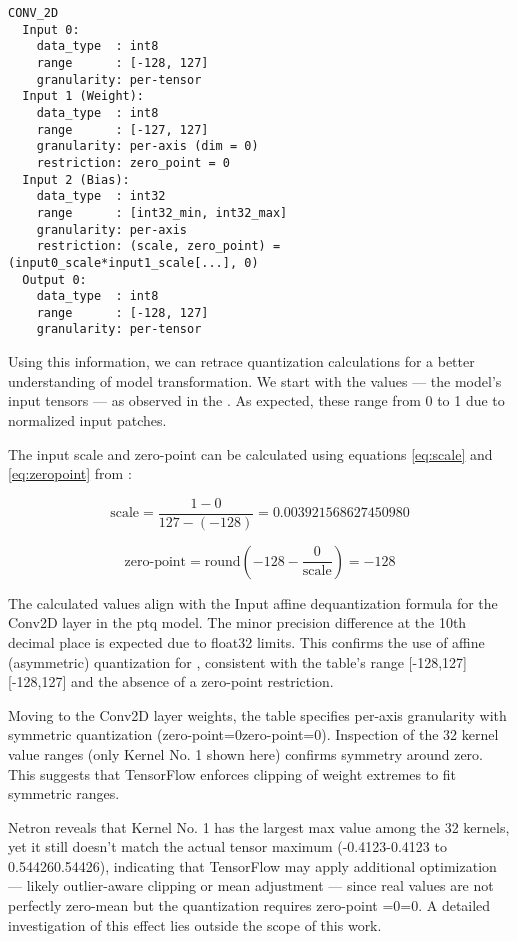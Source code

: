 {\begin{verbatim}
CONV_2D
  Input 0:
    data_type  : int8
    range      : [-128, 127]
    granularity: per-tensor
  Input 1 (Weight):
    data_type  : int8
    range      : [-127, 127]
    granularity: per-axis (dim = 0)
    restriction: zero_point = 0
  Input 2 (Bias):
    data_type  : int32
    range      : [int32_min, int32_max]
    granularity: per-axis
    restriction: (scale, zero_point) = (input0_scale*input1_scale[...], 0)
  Output 0:
    data_type  : int8
    range      : [-128, 127]
    granularity: per-tensor
\end{verbatim}

Using this information, we can retrace quantization calculations for a better understanding of model transformation. We start with the  values — the model's input tensors — as observed in the . As expected, these range from 0 to 1 due to normalized input patches.

The input scale and zero-point can be calculated using equations \ref{eq:scale} and \ref{eq:zeropoint} from :

\begin{equation*}
\text{scale} = \frac{1 - 0}{127 - (-128)} = 0.003921568627450980
\end{equation*}

\begin{equation*}
\text{zero-point} = \text{round}\left( -128 - \frac{0}{\text{scale}} \right) = -128
\end{equation*}

The calculated values align with the Input affine dequantization formula for the Conv2D layer in the \gls{ptq} model. The minor precision difference at the 10th decimal place is expected due to \gls{float32} limits. This confirms the use of affine (asymmetric) quantization for , consistent with the table's range [-128,127][-128,127] and the absence of a zero-point restriction.

Moving to the Conv2D layer weights, the table specifies per-axis granularity with symmetric quantization (zero-point=0zero-point=0). Inspection of the 32 kernel value ranges (only Kernel No. 1 shown here) confirms symmetry around zero. This suggests that TensorFlow enforces clipping of weight extremes to fit symmetric ranges.

Netron reveals that Kernel No. 1 has the largest max value among the 32 kernels, yet it still doesn't match the actual tensor maximum (-0.4123-0.4123 to 0.544260.54426), indicating that TensorFlow may apply additional optimization — likely outlier-aware clipping or mean adjustment — since real values are not perfectly zero-mean but the quantization requires zero-point =0=0. A detailed investigation of this effect lies outside the scope of this work.

}
